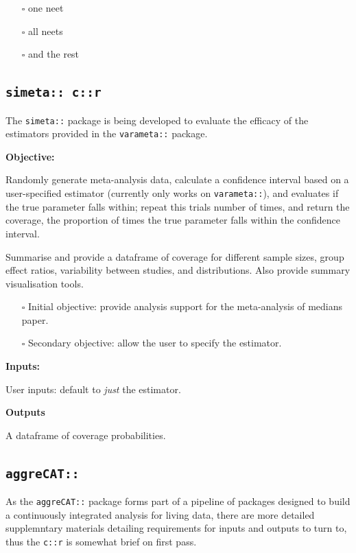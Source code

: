 \documentclass[
]{article}
\providecommand{\tightlist}{%
  \setlength{\itemsep}{0pt}\setlength{\parskip}{0pt}}
\begin{document}
\begin{itemize}
\tightlist
\item[$\square$]
  one neet
\item[$\square$]
  all neets
\item[$\square$]
  and the rest
\end{itemize}

\hypertarget{simeta-cr}{%
\subsection{\texorpdfstring{\texttt{simeta::\ c::r}}{simeta:: c::r}}\label{simeta-cr}}

The \texttt{simeta::} package is being developed to evaluate the
efficacy of the estimators provided in the \texttt{varameta::} package.

\textbf{Objective:}

Randomly generate meta-analysis data, calculate a confidence interval
based on a user-specified estimator (currently only works on
\texttt{varameta::}), and evaluates if the true parameter falls within;
repeat this \textbar trials\textbar{} number of times, and return the
coverage, the proportion of times the true parameter falls within the
confidence interval.

Summarise and provide a dataframe of coverage for different sample
sizes, group effect ratios, variability between studies, and
distributions. Also provide summary visualisation tools.

\begin{itemize}
\item[$\square$]
  Initial objective: provide analysis support for the meta-analysis of
  medians paper.
\item[$\square$]
  Secondary objective: allow the user to specify the estimator.
\end{itemize}

\textbf{Inputs:}

User inputs: default to \emph{just} the estimator.

\textbf{Outputs}

A dataframe of coverage probabilities.

\hypertarget{aggrecat}{%
\subsection{\texorpdfstring{\texttt{aggreCAT::}}{aggreCAT::}}\label{aggrecat}}

As the \texttt{aggreCAT::} package forms part of a pipeline of packages
designed to build a continuously integrated analysis for living data,
there are more detailed supplemntary materials detailing requirements
for inputs and outputs to turn to, thus the \texttt{c::r} is somewhat
brief on first pass.
\end{document}
